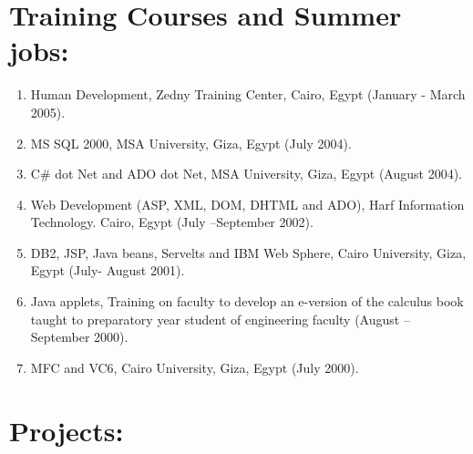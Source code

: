 \documentclass{article}
\begin{document}
 \section*{Training Courses and Summer jobs:}
 \begin{enumerate}
\item Human Development, Zedny Training Center, Cairo, Egypt (January - March 2005).
 \item MS SQL 2000, MSA University, Giza, Egypt (July 2004).
 \item C\# dot Net and ADO dot Net, MSA University, Giza, Egypt (August 2004).
 \item Web Development (ASP, XML, DOM, DHTML and ADO), Harf Information Technology. Cairo, Egypt (July --September 2002).
 \item DB2, JSP, Java beans, Servelts and IBM Web Sphere, Cairo University, Giza, Egypt (July- August 2001).
 \item Java applets, Training on faculty to develop an e-version of the calculus book taught to preparatory year student of engineering faculty (August -- September 2000).
 \item MFC and VC6, Cairo University, Giza, Egypt (July 2000).
\end{enumerate}



 \section*{Projects:}
\end{document}
